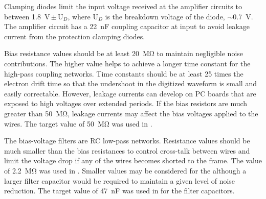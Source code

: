 Clamping diodes limit the input voltage received at the amplifier circuits to between \SI{1.8}{V}\,$\pm$\,U$_D$, where U$_D$
is the breakdown voltage of the diode, $\sim$\SI{0.7}{V}.
The amplifier circuit has a \SI{22}{nF} coupling capacitor at input to avoid leakage current from the protection clamping diodes. 


Bias resistance values should be at least \SI{20}{\mega\ohm} to maintain negligible noise contributions.
The higher value helps to achieve a longer time constant for the high-pass coupling networks.
Time constants should be at least \num{25} times the electron drift time so that the undershoot in the digitized waveform
is small and easily correctable.
However, leakage currents can develop on PC boards that are exposed to high voltages over extended periods.
If the bias resistors are much greater than \SI{50}{\mega\ohm}, leakage currents may affect the bias voltages applied to the wires. The target value of \SI{50}{\mega\ohm} was used in .

The bias-voltage filters are RC low-pass networks.
Resistance values should be much smaller than the bias resistances to control cross-talk between wires
and limit the voltage drop if any of the wires becomes shorted to the  frame.
The value of \SI{2.2}{\mega\ohm} was used in .
Smaller values may be considered for %
the  although a larger filter capacitor would be required to maintain a given level of noise reduction.
The target value of \SI{47}{nF} was used in  for the filter capacitors.


